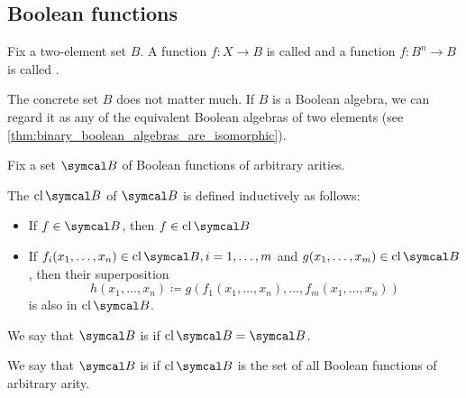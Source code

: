 \subsection{Boolean functions}\label{subsec:boolean_functions}

\begin{definition}\label{def:boolean_function}
  Fix a two-element set \( B \). A function \( f: X \to B \) is called  and a function \( f: B^n \to B \) is called .

  The concrete set \( B \) does not matter much. If \( B \) is a Boolean algebra, we can regard it as any of the equivalent Boolean algebras of two elements (see \cref{thm:binary_boolean_algebras_are_isomorphic}).
\end{definition}

\begin{definition}\label{def:boolean_closure}
  Fix a set \( \Cal{B} \) of Boolean functions of arbitrary arities.

  The  \( \Cl{\Cal{B}} \) of \( \Cal{B} \) is defined inductively as follows:
  \begin{itemize}
    \item If \( f \in \Cal{B} \), then \( f \in \Cl{\Cal{B}} \)
    \item If \( f_i(x_1, \ldots, x_n) \in \Cl{\Cal{B}}, i = 1, \ldots, m \) and \( g(x_1, \ldots, x_m) \in \Cl{\Cal{B}} \), then their superposition
    \begin{equation*}
      h(x_1, \ldots, x_n) \coloneqq g(f_1(x_1, \ldots, x_n), \ldots, f_m(x_1, \ldots, x_n))
    \end{equation*}
    is also in \( \Cl{\Cal{B}} \).
  \end{itemize}

  We say that \( \Cal{B} \) is  if \( \Cl{\Cal{B}} = \Cal{B} \).

  We say that \( \Cal{B} \) is  if \( \Cl{\Cal{B}} \) is the set of all Boolean functions of arbitrary arity.
\end{definition}

